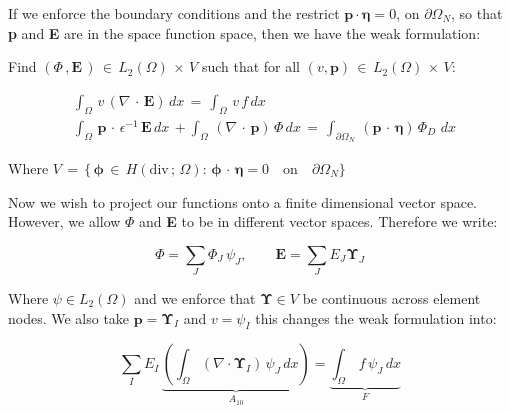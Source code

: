 \documentclass[10pt]{report}
\numberwithin{equation}{section}
\begin{document}
\noindent
If we enforce the boundary conditions and the restrict $\textbf{p}
\cdot \boldsymbol \eta = 0$, on $\partial \Omega_{N}$, so that \textbf{p} and \textbf{E} are in the space function space, then we have the weak formulation:


\vspace{2mm}

\begin{center}
Find $(\Phi \, , \textbf{E} \, )\, \in \, L_{2}(\Omega) \, 
\times\, V$ such that for all $(v, \textbf{p}) \, \in \, L_{2}(\Omega) \, 
\times\, V$:
\end{center}


\begin{align}
&\int_{\Omega} \, v  \, \left( \nabla  \, \cdot \, \textbf{E} \right) \, dx \, =  \, \int_{\Omega} \, v  \, f \, dx  \\
&\int_{\Omega} \, \textbf{p} \, \cdot \, \epsilon^{-1} \, \textbf{E} \, dx \, 
+ \int_{\Omega} \, \left(\nabla \, \cdot \, \textbf{p} \right)\, \Phi \, dx 
\, = \, 
\int_{\partial \Omega_{N}} \, \left( \textbf{p} \, \cdot \, \boldsymbol \eta \right) \, \Phi_{D} \,  \, dx  \, 
\end{align}


\vspace{2mm}


\noindent
Where $V  \, = \,  \{ \, \boldsymbol \phi \, \in \, H(\text{div}\,; \, \Omega) : \, \boldsymbol \phi \, \cdot \, \boldsymbol \eta = 0 \quad \text{on} \quad \partial \Omega_{N} \} $


\vspace{2mm}


\noindent
Now we wish to project our functions onto a finite dimensional vector space.  However, we allow $\Phi$ and \textbf{E} to be in different vector spaces. Therefore we write:

\vspace{2mm}


$$ \Phi = \sum_{J} \Phi_{J} \, \psi_{J} ,  \qquad \textbf{E} = \sum_{J} E_{J} \boldsymbol \Upsilon_{J} $$


\vspace{2mm}


\noindent
Where $\psi \in L_{2}(\Omega)$ and we enforce that $\boldsymbol \Upsilon \in V$ be continuous across element nodes.  We also take $\textbf{p} = \boldsymbol \Upsilon_{I}$ and $v = \psi_{I}$ this changes the weak formulation into:


$$ \sum_{I} E_{I} \, \underbrace{\left( \int_{\Omega} (\nabla \cdot \boldsymbol \Upsilon_{I}) \,
 \psi_{J} \, dx \right)}_{A_{10}} = 
\underbrace{\int_{\Omega} \,f \, \psi_{J} \, dx}_{F}$$
\end{document}
